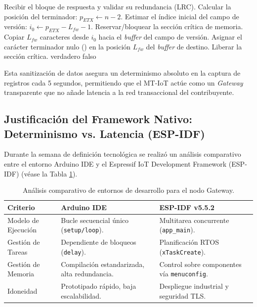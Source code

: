 \begin{algorithm}[htbp]
	\caption{Mitigación analítica del error \textit{Off-By-One} en el procesamiento de la trama SV2.}
	\label{alg:offbyone}
	\begin{algorithmic}[1]
		\State Recibir el bloque de respuesta y validar su redundancia (LRC).
		\State Calcular la posición del terminador: $p_{ETX} \leftarrow n - 2$.
		\State Estimar el índice inicial del campo de versión: $i_0 \leftarrow p_{ETX} - L_{fw} - 1$.
		\State Reservar/bloquear la sección crítica de memoria.
		\State Copiar $L_{fw}$ caracteres desde $i_0$ hacia el \textit{buffer} del campo de versión.
		\State Asignar el carácter terminador nulo () en la posición $L_{fw}$ del \textit{buffer} de destino.
		\State Liberar la sección crítica.
		\State \Return verdadero
	\EndIf
	\State \Return falso
	\end{algorithmic}
\end{algorithm}

\par Esta sanitización de datos asegura un determinismo absoluto en la captura de registros cada 5 segundos, permitiendo que el MT-IoT actúe como un \textit{Gateway} transparente que no añade latencia a la red transaccional del contribuyente.

\subsection{Justificación del Framework Nativo: Determinismo vs. Latencia (ESP-IDF)}

\par Durante la semana de definición tecnológica se realizó un análisis comparativo entre el entorno Arduino IDE y el Espressif IoT Development Framework (ESP-IDF) (véase la Tabla \ref{tab:comparativa_frameworks}).\\

\begin{table}[htbp]
    \centering
    \caption{Análisis comparativo de entornos de desarrollo para el nodo Gateway.}
    \label{tab:comparativa_frameworks}
    \begin{tabularx}{\textwidth}{@{}>{\raggedright\arraybackslash}p{3.0cm} >{\raggedright\arraybackslash}X >{\raggedright\arraybackslash}X@{}}
        \toprule
        \textbf{Criterio} & \textbf{Arduino IDE} & \textbf{ESP-IDF v5.5.2} \\
        \midrule
        Modelo de Ejecución & Bucle secuencial único (\texttt{setup/loop}). & Multitarea concurrente (\texttt{app\_main}). \\
        Gestión de Tareas & Dependiente de bloqueos (\texttt{delay}). & Planificación RTOS (\texttt{xTaskCreate}). \\
        Gestión de Memoria & Compilación estandarizada, alta redundancia. & Control sobre componentes vía \texttt{menuconfig}. \\
        Idoneidad & Prototipado rápido, baja escalabilidad. & Despliegue industrial y seguridad TLS. \\
        \bottomrule
    \end{tabularx}
\end{table}

